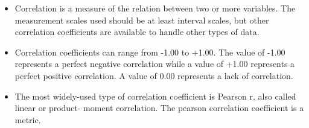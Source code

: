 \documentclass[]{report}
\begin{document}
		


		
		
		\begin{itemize}
			\item Correlation is a measure of the relation between two or more variables. The measurement scales used should be at least interval scales, but other correlation coefficients are available to handle other types of data.
			\item Correlation coefficients can range from -1.00 to +1.00. The value of -1.00 represents a perfect negative correlation while a value of +1.00 represents a perfect positive correlation. A value of 0.00 represents a lack of correlation.
			\item 
			The most widely-used type of correlation coefficient is Pearson r, also called linear or product- moment correlation.
			The pearson correlation coefficient is a metric.
		\end{itemize}

		
\end{document}
